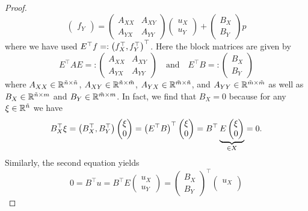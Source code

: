 \begin{proof}
\[\begin{pmatrix}
			f_Y
		\end{pmatrix} = \begin{pmatrix}
			A_{XX} & A_{XY}\\
			A_{YX} & A_{YY}
		\end{pmatrix}\begin{pmatrix}
			u_X\\
			u_Y
		\end{pmatrix} + \begin{pmatrix}
			B_X\\
			B_Y
		\end{pmatrix}p
	\]
	where we have used \(E^\top f =: \parentheses*{f_X^\top, f_Y^\top}^\top\).
	Here the block matrices are given by
	\[
		E^\top AE =: \begin{pmatrix}
			A_{XX} & A_{XY}\\
			A_{YX} & A_{YY}
		\end{pmatrix} \quad \text{and} \quad E^\top B =: \begin{pmatrix}
			B_X\\
			B_Y
		\end{pmatrix}
	\]
	where \(A_{XX} \in \R^{\tilde{n} \times \tilde{n}}\), \(A_{XY} \in \R^{\tilde{n} \times \tilde{m}}\), \(A_{YX} \in \R^{\tilde{m} \times \tilde{n}}\), and \(A_{YY} \in \R^{\tilde{m} \times \tilde{m}}\) as well as \(B_X \in \R^{\tilde{n} \times m}\) and \(B_Y \in \R^{\tilde{m} \times m}\).
	In fact, we find that \(B_X = 0\) because for any \(\xi \in \R^{\tilde{n}}\) we have
	\[
		B_X^\top \xi = \parentheses*{B_X^\top, B_Y^\top}\begin{pmatrix}
			\xi\\
			0
		\end{pmatrix} = \parentheses*{E^\top B}^\top \begin{pmatrix}
			\xi\\
			0
		\end{pmatrix} = B^\top \underbrace{E\begin{pmatrix}
			\xi\\
			0
		\end{pmatrix}}_{\in X} = 0.
	\]
	Similarly, the second equation yields
	\[
		0 = B^\top u = B^\top E\begin{pmatrix}
			u_X\\
			u_Y
		\end{pmatrix} = \begin{pmatrix}
			B_X\\
			B_Y
		\end{pmatrix}^\top \begin{pmatrix}
			u_X\\

\end{pmatrix}\]
\end{proof}
